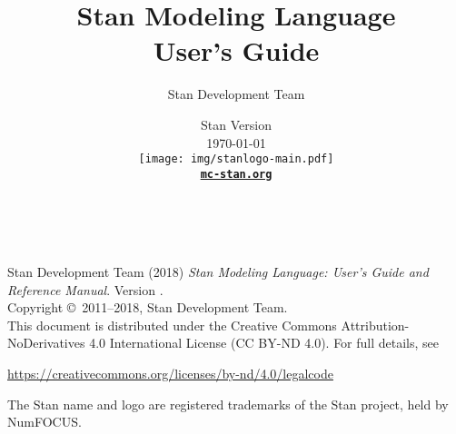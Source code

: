 \title{\Huge\bf Stan Modeling Language \\[4pt] User's Guide}
\author{Stan Development Team}

\date{\vspace*{36pt} Stan Version \stanversion
\\[8pt] {\small \today}
\\[36pt]
{
\vfill
\texttt{[image: img/stanlogo-main.pdf]}}
\\
\vspace*{6pt}
{\bfseries \href{http://mc-stan.org/}{\tt mc-stan.org}}
}
\maketitle

\newpage
\thispagestyle{empty}
\mbox{ }
\vfill
\begin{center}
\begin{minipage}[t]{0.75\textwidth}
\small
Stan Development Team (2018)
{\it Stan Modeling Language: User's Guide and Reference Manual}. Version
\stanversion.
\vspace*{20pt}
\mbox{ }
\\
Copyright \copyright \ 2011--2018, Stan Development Team.
\vspace*{28pt}
\mbox{} \\
This document is distributed under the Creative Commons
Attribution-NoDerivatives 4.0 International License (CC BY-ND 4.0).
For full details, see
\begin{center}
\url{https://creativecommons.org/licenses/by-nd/4.0/legalcode}
\end{center}
The Stan name and logo are registered trademarks of the Stan project,
held by NumFOCUS.
\end{minipage}
\vspace*{24pt}
\mbox{ }
\end{center}
